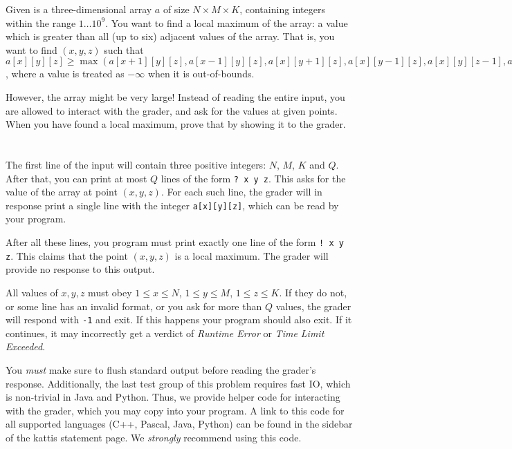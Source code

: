 \ifx\boi\undefined\fi
\def\version{jury-draft}

Given is a three-dimensional array $a$ of size $N \times M \times K$, containing integers within the range $1 \dots 10^9$.
You want to find a local maximum of the array: a value which is greater than all (up to six) adjacent values of the array.
That is, you want to find $(x,y,z)$ such that $a[x][y][z] \ge \max(a[x+1][y][z], a[x-1][y][z], a[x][y+1][z], a[x][y-1][z], a[x][y][z-1], a[x][y][z+1])$,
where a value is treated as $-\infty$ when it is out-of-bounds.

However, the array might be very large!
Instead of reading the entire input, you are allowed to interact with the grader, and ask for the values at given points.
When you have found a local maximum, prove that by showing it to the grader.

\section*{\interactivity}
The first line of the input will contain three positive integers: $N$, $M$, $K$ and $Q$.
After that, you can print at most $Q$ lines of the form \texttt{? x y z}.
This asks for the value of the array at point $(x, y, z)$.
For each such line, the grader will in response print a single line with the integer \texttt{a[x][y][z]}, which can be read by your program.

After all these lines, you program must print exactly one line of the form \texttt{! x y z}.
This claims that the point $(x, y, z)$ is a local maximum.
The grader will provide no response to this output.

All values of $x, y, z$ must obey $1 \le x \le N$, $1 \le y \le M$, $1 \le z \le K$.
If they do not, or some line has an invalid format, or you ask for more than $Q$ values,
the grader will respond with \texttt{-1} and exit.
If this happens your program should also exit. If it continues, it may incorrectly get
a verdict of \emph{Runtime Error} or \emph{Time Limit Exceeded}.

You \emph{must} make sure to flush standard output before reading the grader's response.
Additionally, the last test group of this problem requires fast IO, which is non-trivial in Java and Python.
Thus, we provide helper code for interacting with the grader, which you may copy into your program.
A link to this code for all supported languages (C++, Pascal, Java, Python) can
be found in the sidebar of the kattis statement page.
We \emph{strongly} recommend using this code.

